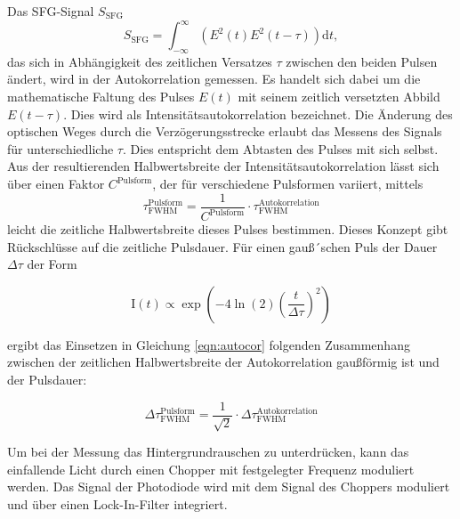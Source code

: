         \FloatBarrier
        Das SFG-Signal $S_{\text{SFG}}$
        \begin{equation}
            S_{\text{SFG}} = \int_{-\infty}^{\infty} \left(E^2 (t)  E^2 (t-\tau)\right) \text{d}t ,
            \label{eqn:autocor}
        \end{equation}
        das sich in Abhängigkeit des zeitlichen Versatzes $\tau$ zwischen den beiden Pulsen ändert, wird in der Autokorrelation gemessen. Es handelt sich dabei um die mathematische Faltung des Pulses $E(t)$ 
        mit seinem zeitlich versetzten Abbild $E(t - \tau)$. Dies wird als Intensitätsautokorrelation bezeichnet. Die Änderung des optischen Weges durch die Verzögerungsstrecke erlaubt das Messens des Signals 
        für unterschiedliche $\tau$. Dies entspricht dem Abtasten des Pulses mit sich selbst. Aus der resultierenden Halbwertsbreite der Intensitätsautokorrelation lässt sich über einen Faktor 
        $C^{\text{Pulsform}}$, der für verschiedene Pulsformen variiert, mittels 
        \begin{equation*}
            \tau_{\text{FWHM}}^{\text{Pulsform}} = \frac{1}{C^{\text{Pulsform}}} \cdot \tau_{\text{FWHM}}^{\text{Autokorrelation}}
        \end{equation*}
        leicht die zeitliche Halbwertsbreite dieses Pulses bestimmen. Dieses Konzept gibt Rückschlüsse auf die zeitliche Pulsdauer. 
        Für einen gauß´schen Puls der Dauer $\Delta \tau$ der Form

        \begin{equation}
          \text{I}(t) \propto \exp\left(-4\ln(2)\left(\frac{t}{\Delta \tau}\right)^2\right)
        \end{equation}

        ergibt das Einsetzen in Gleichung \ref{eqn:autocor} folgenden Zusammenhang zwischen der zeitlichen Halbwertsbreite der Autokorrelation gaußförmig ist und der Pulsdauer:

        \begin{equation*}
          \Delta\tau_{\text{FWHM}}^{\text{Pulsform}} = \frac{1}{\sqrt{2}} \cdot \Delta\tau_{\text{FWHM}}^{\text{Autokorrelation}}
        \end{equation*}
        
        Um bei der Messung das Hintergrundrauschen zu unterdrücken, kann das 
        einfallende Licht durch einen Chopper mit festgelegter Frequenz moduliert werden. Das Signal der Photodiode wird mit dem Signal des Choppers moduliert und über einen Lock-In-Filter integriert.


